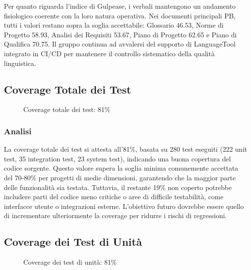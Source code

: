 \documentclass[a4paper,11pt,oneside]{scrartcl}
\begin{document}
Per quanto riguarda l'indice di Gulpease, i verbali mantengono un andamento fisiologico coerente con la loro natura operativa. Nei documenti principali PB, tutti i valori restano sopra la soglia accettabile: Glossario 46.53, Norme di Progetto 58.93, Analisi dei Requisiti 53.67, Piano di Progetto 62.65 e Piano di Qualifica 70.75. Il gruppo continua ad avvalersi del supporto di LanguageTool integrato in CI/CD per mantenere il controllo sistematico della qualità linguistica.

\subsection{Coverage Totale dei Test}

\begin{figure}[H]
    \centering
    \caption{Coverage totale dei test: 81\%}
    \label{fig:coverage_totale}
\end{figure}

\subsubsection*{Analisi}

La coverage totale dei test si attesta all'81\%, basata su 280 test eseguiti (222 unit test, 35 integration test, 23 system test), indicando una buona copertura del codice sorgente. Questo valore supera la soglia minima comunemente accettata del 70-80\% per progetti di medie dimensioni, garantendo che la maggior parte delle funzionalità sia testata. Tuttavia, il restante 19\% non coperto potrebbe includere parti del codice meno critiche o aree di difficile testabilità, come interfacce utente o integrazioni esterne. L'obiettivo futuro dovrebbe essere quello di incrementare ulteriormente la coverage per ridurre i rischi di regressioni.

\subsection{Coverage dei Test di Unità}

\begin{figure}[H]
    \centering
    \caption{Coverage dei test di unità: 81\%}
    \label{fig:coverage_unita}
\end{figure}
\end{document}
